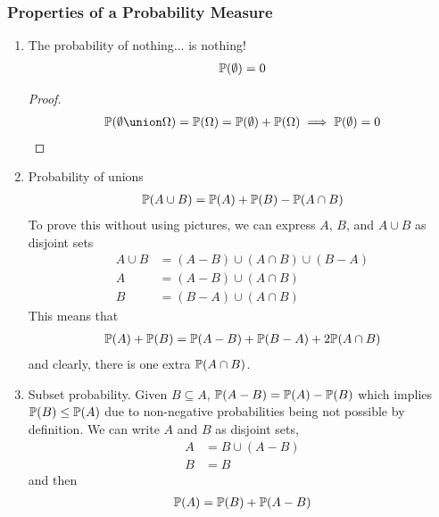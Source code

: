 \subsubsection{Properties of a Probability Measure}
\begin{enumerate}
    \item The probability of nothing... is nothing!
    \begin{align}
        \mathbb{P}(\emptyset) = 0
    \end{align}
    \begin{proof}
        \begin{align}
            \probability(\emptyset \union \Omega) = \probability(\Omega) = \probability(\emptyset) + \probability(\Omega) \implies \probability(\emptyset) = 0
        \end{align}
    \end{proof}
    \item Probability of unions
    \begin{align}
        \mathbb{P}(A \cup B) = \mathbb{P}(A) + \mathbb{P}(B) - \mathbb{P}(A \cap B)
    \end{align}
    To prove this without using pictures, we can express $A$, $B$, and $A \cup B$ as disjoint sets
    \begin{align}
        A \cup B &= (A - B) \cup (A \cap B) \cup (B - A)\\
        A &= (A - B) \cup (A \cap B)\\
        B &= (B - A) \cup (A \cap B)
    \end{align}
    This means that
    \begin{align}
        \mathbb{P}(A) + \mathbb{P}(B) = \mathbb{P}(A - B) + \mathbb{P}(B - A) + 2 \mathbb{P}(A \cap B)
    \end{align}
    and clearly, there is one extra $\mathbb{P}(A \cap B)$.
    \item Subset probability. Given $B \subseteq A$, $\mathbb{P}(A - B) = \mathbb{P}(A) - \mathbb{P}(B)$ which implies $\mathbb{P}(B) \le \mathbb{P}(A)$ due to non-negative probabilities being not possible by definition. We can write $A$ and $B$ as disjoint sets,
    \begin{align}
        A &= B \cup (A-B)\\
        B &= B
    \end{align}
    and then
    \begin{align}
        \probability(A) &= \probability(B) + \probability(A - B)\\

\end{align}
\end{enumerate}
